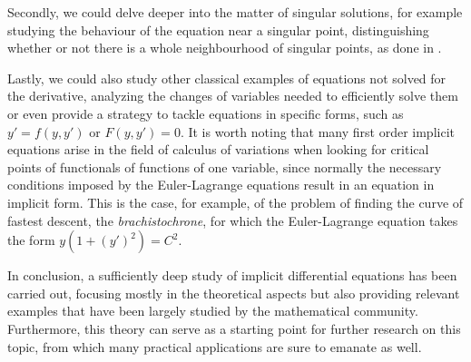 Secondly, we could delve deeper into the matter of singular solutions, for example studying the behaviour of the equation near a singular point, distinguishing whether or not there is a whole neighbourhood of singular points, as done in \cite{rabier1989implicit}.

Lastly, we could also study other classical examples of equations not solved for the derivative, analyzing the changes of variables needed to efficiently solve them or even provide a strategy to tackle equations in specific forms, such as $y'=f(y,y')$ or $F(y,y')=0$. It is worth noting that many first order implicit equations arise in the field of calculus of variations when looking for critical points of functionals of functions of one variable, since normally the necessary conditions imposed by the Euler-Lagrange equations result in  an equation in implicit form. This is the case, for example, of the problem of finding the curve of fastest descent, the \textit{brachistochrone}, for which the Euler-Lagrange equation takes the form $y(1+(y')^2)=C^2$.

In conclusion, a sufficiently deep study of implicit differential equations has been carried out, focusing mostly in the theoretical aspects but also providing relevant examples that have been largely studied by the mathematical community. Furthermore, this theory can serve as a starting point for further research on this topic, from which many practical applications are sure to emanate as well.
